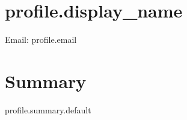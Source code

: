 \documentclass{article}
\begin{document}
\section*{ {{ profile.display_name }} }
Email: {{ profile.email }}

\section*{Summary}
{{ profile.summary.default }}
\end{document}
